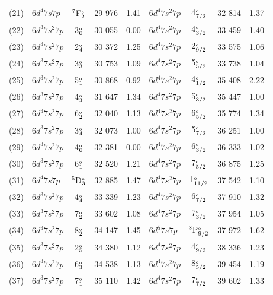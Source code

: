 \documentclass[8pt,a4paper, twoside]{report}
\begin{document}
\begin{table}[t]
\begin{tabular}{cl@{\hspace{0.5cm}}c@{\hspace{0.5cm}}r@{\hspace{0.5cm}}r@{\hspace{1cm}}l@{\hspace{0.5cm}}c@{\hspace{0.5cm}}r@{\hspace{0.5cm}}r}
(21) & $6d^4 7s  7p $  &  $^7$F$_2^{\rm_o}$   & 29 976 & 1.41   &   $6d^4 7s^2 7p $  & 4$_{7/2}^{\rm_o}$  & 32 814 & 1.37 \\ 
(22) & $6d^3 7s^2 7p$  &  3$_0^{\rm_o}$ & 30 055 & 0.00 &  $6d^4 7s^2 7p $  & 4$_{3/2}^{\rm_o}$  & 33 459 & 1.40 \\
(23) & $6d^3 7s^2 7p$  &  2$_4^{\rm_o}$ & 30 372 & 1.25 & $6d^4 7s^2 7p $  & 2$_{9/2}^{\rm_o}$  & 33 575 & 1.06 \\
(24) & $6d^3 7s^2 7p$ & 3$_3^{\rm_o}$  & 30 753 & 1.09 & $6d^4 7s^2 7p $  & 5$_{5/2}^{\rm_o}$     & 33 738 & 1.04 \\
(25) & $6d^3 7s^2 7p$  & 5$_1^{\rm_o}$  & 30 868 & 0.92 & $6d^4 7s^2 7p $  &  4$_{1/2}^{\rm_o}$  & 35 408 & 2.22 \\
(26) & $6d^3 7s^2 7p$ & 4$_3^{\rm_o}$ & 31 647 & 1.34  & $6d^4 7s^2 7p $  & 5$_{3/2}^{\rm_o}$   & 35 447 & 1.00 \\
(27) & $6d^3 7s^2 7p$  & 6$_2^{\rm_o}$  & 32 040 & 1.13 & $6d^4 7s^2 7p $  & 6$_{5/2}^{\rm_o}$  & 35 774 & 1.34 \\
(28) & $6d^3 7s^2 7p$  &  3$_4^{\rm_o}$ & 32 073 & 1.00 & $6d^4 7s^2 7p $  & 5$_{7/2}^{\rm_o}$   & 36 251 & 1.00 \\
(29) & $6d^3 7s^2 7p$ &  4$_0^{\rm_o}$ & 32 381 & 0.00 & $6d^4 7s^2 7p $  & 6$_{3/2}^{\rm_o}$    & 36 333 & 1.02 \\
(30) & $6d^3 7s^2 7p$ &  6$_1^{\rm_o}$  & 32 520 & 1.21 & $6d^4 7s^2 7p $  & 7$_{5/2}^{\rm_o}$    & 36 875 & 1.25 \\
(31) & $6d^4 7s  7p $  &  $^5$D$_3^{\rm_o}$ & 32 885 & 1.47 & $6d^4 7s^2 7p $  &  1$_{11/2}^{\rm_o}$    & 37 542 & 1.10 \\
(32) & $6d^3 7s^2 7p$  &  4$_4^{\rm_o}$ & 33 339 & 1.23 & $6d^4 7s^2 7p $  & 6$_{7/2}^{\rm_o}$  & 37 910 & 1.32 \\
(33) & $6d^3 7s^2 7p$  & 7$_2^{\rm_o}$  & 33 602 & 1.08 & $6d^4 7s^2 7p $  & 7$_{3/2}^{\rm_o}$     & 37 954 & 1.05 \\
(34) & $6d^3 7s^2 7p$  & 8$_2^{\rm_o}$  & 34 147 & 1.45 & $6d^5 7s 7p $  &  $^8$P$_{9/2}^{\rm_o}$    & 37 972 & 1.62 \\
(35) & $6d^3 7s^2 7p$  &  2$_{5}^{\rm_o}$ & 34 380 & 1.12 & $6d^4 7s^2 7p $  & 4$_{9/2}^{\rm_o}$  & 38 336 & 1.23 \\  
(36) & $6d^3 7s^2 7p$  & 6$_3^{\rm_o}$  & 34 538 & 1.13 & $6d^4 7s^2 7p $  & 8$_{5/2}^{\rm_o}$  & 39 454 & 1.19 \\
(37) & $6d^3 7s^2 7p$  & 7$_1^{\rm_o}$  & 35 110 & 1.42 & $6d^4 7s^2 7p $  & 7$_{7/2}^{\rm_o}$  & 39 602 & 1.33 \\

\end{tabular}
\end{table}
\end{document}
